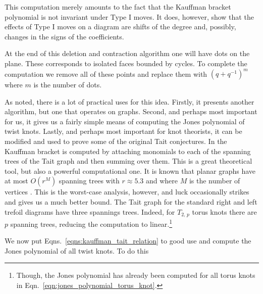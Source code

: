             This computation merely amounts to the fact that the Kauffman
            bracket polynomial is not invariant under Type I moves. It does,
            however, show that the effects of Type I moves on a diagram
            are shifts of the degree and, possibly, changes in the signs
            of the coefficients.
            \par\hfill\par
            At the end of this deletion and contraction algorithm one will have
            dots on the plane. These corresponds to isolated faces bounded
            by cycles. To complete the computation we remove all of these
            points and replace them with $(q+q^{-1})^{m}$ where $m$ is the
            number of dots.
            \par\hfill\par
            As noted, there is a lot of practical uses for this idea. Firstly,
            it presents another algorithm, but one that operates on graphs.
            Second, and perhaps most important for us, it gives us a fairly
            simple means of computing the Jones polynomial of twist knots.
            Lastly, and perhaps most important for knot theorists, it can be
            modified and used to prove some of the original Tait conjectures.
            In \cite{ThistlethwaiteSpanningTree} the Kauffman bracket is
            computed by attaching monomials to each of the spanning trees of
            the Tait graph and then summing over them. This is a great
            theoretical tool, but also a powerful computational one.
            It is known that planar graphs have at most
            $O(r^{M})$ spanning trees with $r\approx{5.3}$ and where $M$ is the
            number of vertices \cite{NumberOfSpanningTrees}. This is the
            worst-case analysis, however, and luck occasionally strikes and
            gives us a much better bound. The Tait graph for the standard
            right and left trefoil diagrams have three spannings trees. Indeed,
            for $T_{2,\,p}$ torus knots there are $p$ spanning trees, reducing
            the computation to linear.\footnote{%
                Though, the Jones polynomial has already been computed for
                all torus knots in Eqn.~\ref{eqn:jones_polynomial_torus_knot}.
            }
            \par\hfill\par
            We now put Eqns.~\ref{eqns:kauffman_tait_relation} to good use
            and compute the Jones polynomial of all twist knots. To do this
